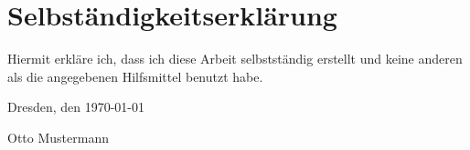  

\section*{\vfill{} \thispagestyle{empty}
Selbständigkeitserklärung}

Hiermit erkläre ich, dass ich diese Arbeit selbstständig erstellt
und keine anderen als die angegebenen Hilfsmittel benutzt habe.
\bigskip{}

\noindent Dresden, den \today %
\vspace{2.5cm}

\noindent Otto Mustermann \cleardoublepage{}
